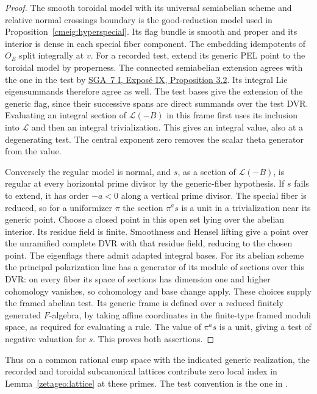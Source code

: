 \begin{proof}
The smooth toroidal model with its universal semiabelian scheme
and relative normal crossings boundary is the good-reduction
model used in Proposition~\ref{cmeig:hyperspecial}. Its flag bundle
is smooth and proper and its interior is dense in each special
fiber component. The embedding idempotents of \(O_E\) split
integrally at \(v\). For a recorded test, extend its generic PEL
point to the toroidal model by properness. The connected
semiabelian extension agrees with the one in the test by
\href{https://grothendiecksga.com/read/sga7/en/9-3.html}
{SGA~7 I, Expos\'e IX, Proposition 3.2}. Its integral Lie
eigensummands therefore agree as well. The test bases give the
extension of the generic flag, since their successive spans are
direct summands over the test DVR. Evaluating an integral section
of \(\mathcal L(-B)\) in this frame first uses its inclusion into
\(\mathcal L\) and then an integral trivialization. This gives
an integral value, also at a degenerating test. The central
exponent zero removes the scalar theta generator from the value.

Conversely the regular model is normal, and \(s\), as a section of
\(\mathcal L(-B)\), is regular at every horizontal prime divisor
by the generic-fiber hypothesis. If \(s\) fails to extend, it has
order \(-a<0\) along a vertical prime divisor. The special fiber
is reduced, so for a uniformizer \(\pi\) the section \(\pi^a s\)
is a unit in a trivialization near its generic point. Choose a
closed point in this open set lying over the abelian interior.
Its residue field is finite. Smoothness and Hensel lifting give
a point over the unramified complete DVR with that residue field,
reducing to the chosen point. The eigenflags there admit adapted
integral bases. For its abelian scheme the principal polarization
line has a generator of its module of sections over this DVR:
on every fiber its space of sections has dimension one and higher
cohomology vanishes, so cohomology and base change apply.
These choices supply the framed abelian test. Its generic frame
is defined over a reduced finitely generated \(F\)-algebra, by
taking affine coordinates in the finite-type framed moduli space,
as required for evaluating a rule. The value of \(\pi^a s\) is a
unit, giving a test of negative valuation for \(s\). This proves
both assertions.
\end{proof}

Thus on a common rational cusp space with the indicated generic
realization, the recorded and toroidal subcanonical lattices
contribute zero local index in Lemma~\ref{zetageo:lattice} at
these primes. The test convention is the one in
.

